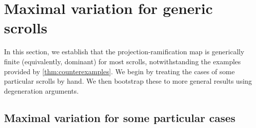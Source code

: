\documentclass[11pt,reqno]{amsart}
\theoremstyle{plain}
\newtheorem{proposition}[theorem]{Proposition}
\newtheorem{corollary}[theorem]{Corollary}
\theoremstyle{definition}
\theoremstyle{remark}
\numberwithin{equation}{section}
\renewcommand{\to}{{\longrightarrow}}
\numberwithin{equation}{section}
\renewcommand{\O}{\mathcal O}
\begin{document}



\section{Maximal variation for generic scrolls}\label{sec:generic}
In this section, we establish that the projection-ramification map is generically finite (equivalently, dominant) for most scrolls, notwithstanding the examples provided by \autoref{thm:counterexamples}.
We begin by treating the cases of some particular scrolls by hand.
We then bootstrap these to more general results using degeneration arguments.

\subsection{Maximal variation for some particular cases}\label{sec:lowdegree}
\end{document}
